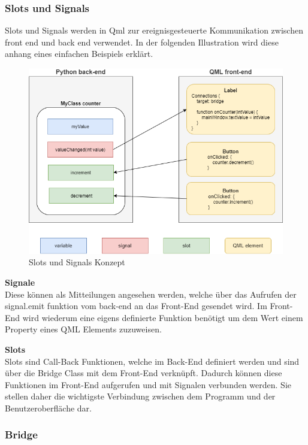 \subsubsection{Slots und Signals} \label{sec:slots}
Slots und Signals werden in Qml zur ereignisgesteuerte Kommunikation zwischen front end und back end verwendet. In der folgenden Illustration wird diese anhang eines einfachen Beispiels erklärt.

\begin{figure}[H]
\begin{center}
\includegraphics[scale=0.4]{figures/hcis/signals_slots.png}
\caption{Slots und Signals Konzept}
\end{center}
\end{figure}

\textbf{Signale}\\ \medskip
Diese können als Mitteilungen angesehen werden, welche über das Aufrufen der signal.emit funktion vom back-end an das Front-End gesendet wird. Im Front-End wird wiederum eine eigens definierte Funktion benötigt um dem Wert einem Property eines QML Elements zuzuweisen.
\medskip

\textbf{Slots}\\ \medskip
Slots sind Call-Back Funktionen, welche im Back-End definiert werden und sind über die Bridge Class mit dem Front-End verknüpft. Dadurch können diese Funktionen im Front-End aufgerufen und mit Signalen verbunden werden. Sie stellen daher die wichtigste Verbindung zwischen dem Programm und der Benutzeroberfläche dar.

\newpage
	
\subsubsection{Bridge}

